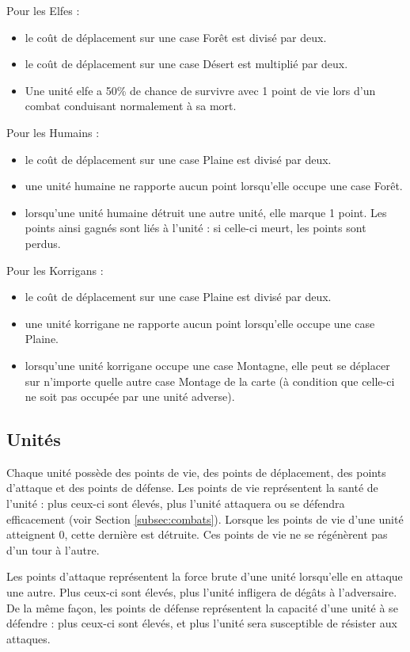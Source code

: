 		Pour les Elfes :
		\begin{itemize}
			\item le coût de déplacement sur une case Forêt est divisé par deux. 
			\item le coût de déplacement sur une case Désert est multiplié par deux.
			\item Une unité elfe a 50\% de chance de survivre avec 1 point de vie lors d’un combat conduisant normalement à sa mort.
		\end{itemize}
		
		Pour les Humains :
		\begin{itemize}
			\item le coût de déplacement sur une case Plaine est divisé par deux.
			\item une unité humaine ne rapporte aucun point lorsqu'elle occupe une case Forêt.
			\item lorsqu’une unité humaine détruit une autre unité, elle marque 1 point. Les points ainsi gagnés sont liés à l'unité : si celle-ci meurt, les points sont perdus.
		\end{itemize}
		
		Pour les Korrigans :
		\begin{itemize}
			\item le coût de déplacement sur une case Plaine est divisé par deux.
			\item une unité korrigane ne rapporte aucun point lorsqu'elle occupe une case Plaine.
			\item lorsqu'une unité korrigane occupe une case Montagne, elle peut se déplacer sur n’importe quelle autre case Montage de la carte (à condition que celle-ci ne soit pas occupée par une unité adverse).
		\end{itemize}

	\subsection{Unités}
	Chaque unité possède des points de vie, des points de déplacement, des points d'attaque et des points de défense. Les points de vie représentent la santé de l'unité : plus ceux-ci sont élevés, plus l'unité attaquera ou se défendra efficacement (voir Section \ref{subsec:combats}). Lorsque les points de vie d'une unité atteignent 0, cette dernière est détruite. Ces points de vie ne se régénèrent pas d'un tour à l'autre.
	
	Les points d'attaque représentent la force brute d'une unité lorsqu'elle en attaque une autre.  Plus ceux-ci sont élevés, plus l'unité infligera de dégâts à l'adversaire. De la même façon, les points de défense représentent la capacité d'une unité à se défendre : plus ceux-ci sont élevés, et plus l'unité sera susceptible de résister aux attaques. 
	
